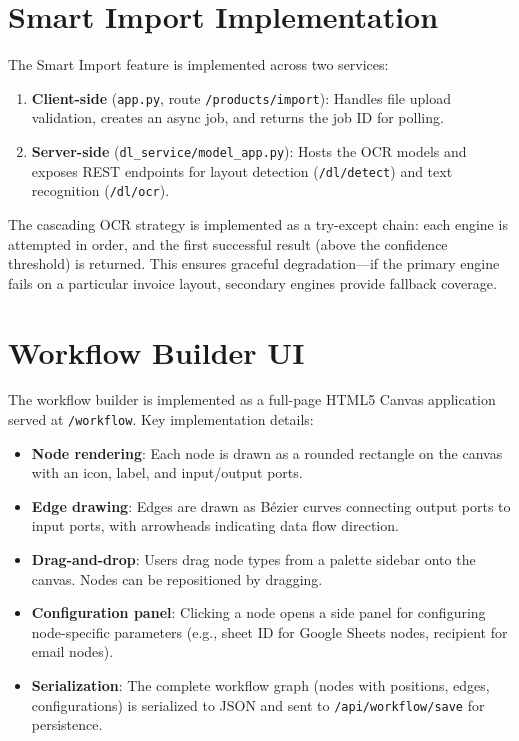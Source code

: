 \documentclass[11pt,a4paper]{report}
\begin{document}
\section{Smart Import Implementation}

The Smart Import feature is implemented across two services:

\begin{enumerate}
  \item \textbf{Client-side} (\texttt{app.py}, route \texttt{/products/import}): Handles file upload validation, creates an async job, and returns the job ID for polling.
  \item \textbf{Server-side} (\texttt{dl\_service/model\_app.py}): Hosts the OCR models and exposes REST endpoints for layout detection (\texttt{/dl/detect}) and text recognition (\texttt{/dl/ocr}).
\end{enumerate}

The cascading OCR strategy is implemented as a try-except chain: each engine is attempted in order, and the first successful result (above the confidence threshold) is returned. This ensures graceful degradation---if the primary engine fails on a particular invoice layout, secondary engines provide fallback coverage.

\section{Workflow Builder UI}

The workflow builder is implemented as a full-page HTML5 Canvas application served at \texttt{/workflow}. Key implementation details:

\begin{itemize}
  \item \textbf{Node rendering}: Each node is drawn as a rounded rectangle on the canvas with an icon, label, and input/output ports.
  \item \textbf{Edge drawing}: Edges are drawn as Bézier curves connecting output ports to input ports, with arrowheads indicating data flow direction.
  \item \textbf{Drag-and-drop}: Users drag node types from a palette sidebar onto the canvas. Nodes can be repositioned by dragging.
  \item \textbf{Configuration panel}: Clicking a node opens a side panel for configuring node-specific parameters (e.g., sheet ID for Google Sheets nodes, recipient for email nodes).
  \item \textbf{Serialization}: The complete workflow graph (nodes with positions, edges, configurations) is serialized to JSON and sent to \texttt{/api/workflow/save} for persistence.
\end{itemize}
\end{document}
